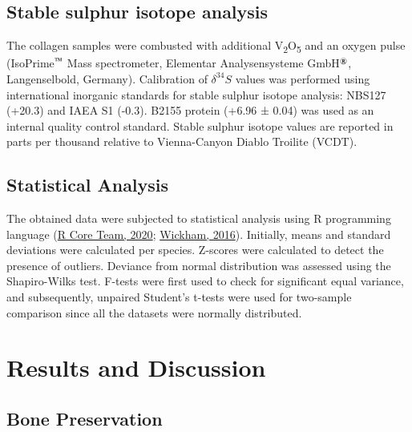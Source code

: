 \documentclass[3p]{elsarticle} %
\begin{document}
\hypertarget{stable-sulphur-isotope-analysis}{%
\subsection{Stable sulphur isotope analysis}\label{stable-sulphur-isotope-analysis}}

The collagen samples were combusted with additional V\textsubscript{2}O\textsubscript{5} and an oxygen pulse (IsoPrime\(^\text{\texttrademark}\) Mass spectrometer, Elementar Analysensysteme GmbH\(^\text{\textregistered}\), Langenselbold, Germany). Calibration of \(\delta ^{34}S\) values was performed using international inorganic standards for stable sulphur isotope analysis: NBS127 (+20.3\text{\textperthousand}) and IAEA S1 (-0.3\text{\textperthousand}). B2155 protein (+6.96 ± 0.04\text{\textperthousand}) was used as an internal quality control standard. Stable sulphur isotope values are reported in parts per thousand relative to Vienna-Canyon Diablo Troilite (VCDT).

\hypertarget{statistical-analysis}{%
\subsection{Statistical Analysis}\label{statistical-analysis}}

The obtained data were subjected to statistical analysis using R programming language (\protect\hyperlink{ref-rcoreteam20}{R Core Team, 2020}; \protect\hyperlink{ref-wickham16}{Wickham, 2016}). Initially, means and standard deviations were calculated per species. Z-scores were calculated to detect the presence of outliers. Deviance from normal distribution was assessed using the Shapiro-Wilks test. F-tests were first used to check for significant equal variance, and subsequently, unpaired Student's t-tests were used for two-sample comparison since all the datasets were normally distributed.

\hypertarget{results-and-discussion}{%
\section{Results and Discussion}\label{results-and-discussion}}

\hypertarget{bone-preservation}{%
\subsection{Bone Preservation}\label{bone-preservation}}

\begingroup\fontsize{7.5}{9.5}\selectfont
\end{document}
